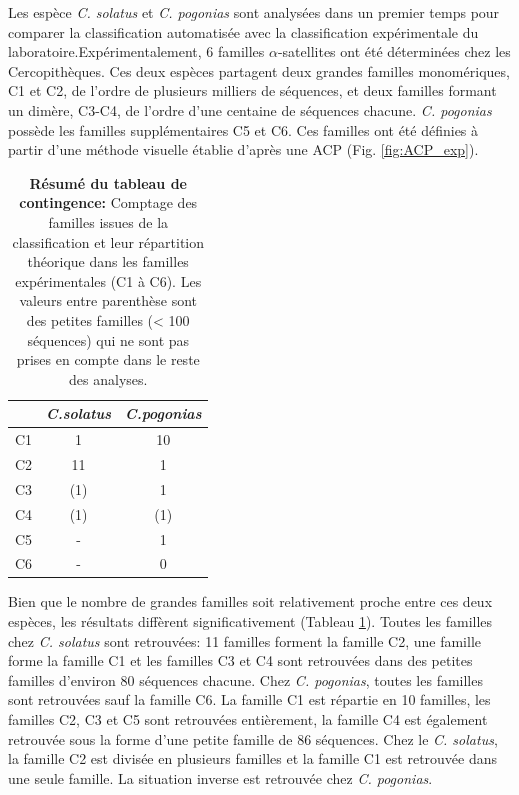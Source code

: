 \documentclass[12pt,a4paper]{article}
\begin{document}
	Les espèce \textit{C. solatus} et \textit{C. pogonias} sont analysées dans un premier temps pour comparer la classification automatisée avec la classification expérimentale du laboratoire.Expérimentalement, 6 familles $\alpha$-satellites ont été déterminées chez les Cercopithèques. Ces deux espèces partagent deux grandes familles monomériques, C1 et C2, de l'ordre de plusieurs milliers de séquences, et deux familles formant un dimère, C3-C4, de l'ordre d'une centaine de séquences chacune. \textit{C. pogonias} possède les familles supplémentaires C5 et C6. Ces familles ont été définies à partir d'une méthode visuelle établie d'après une ACP (Fig. \ref{fig:ACP_exp}).\\
		\begin{table}
			\center
			\begin{tabular}{|c|c|c|}
	    	\hline
			\backslashbox{\bf{Fam. exp.}}{\bf{Espèces}} & \textit{C.solatus} & \textit{C.pogonias}\\
			\hline
			C1 &  1  & 10\\
			\hline
			C2 & 11  & 1 \\
			\hline
			C3 & (1) & 1 \\
			\hline
			C4 & (1) & (1) \\
			\hline
			C5 & - 	 &  1 \\
			\hline
			C6 & -   &  0 \\
			\hline
		\end{tabular}
		\caption{\textbf{Résumé du tableau de contingence:} Comptage des familles issues de la classification et leur répartition théorique dans les familles expérimentales (C1 à C6). Les valeurs entre parenthèse sont des petites familles (< 100 séquences) qui ne sont pas prises en compte dans le reste des analyses.}
		\label{tab_count_fam}
	\end{table}	
	Bien que le nombre de grandes familles soit relativement proche entre ces deux espèces, les résultats diffèrent significativement (Tableau \ref{tab_count_fam}). Toutes les familles chez \textit{C. solatus} sont retrouvées: 11 familles forment la famille C2, une famille forme la famille C1 et les familles C3 et C4 sont retrouvées dans des petites familles d'environ 80 séquences chacune. Chez \textit{C. pogonias}, toutes les familles sont retrouvées sauf la famille C6. La famille C1 est répartie en 10 familles, les familles C2, C3 et C5 sont retrouvées entièrement, la famille C4 est également retrouvée sous la forme d'une petite famille de 86 séquences. Chez le \textit{C. solatus}, la famille C2 est divisée en plusieurs familles et la famille C1 est retrouvée dans une seule famille. La situation inverse est retrouvée  chez \textit{C. pogonias}.
\end{document}
